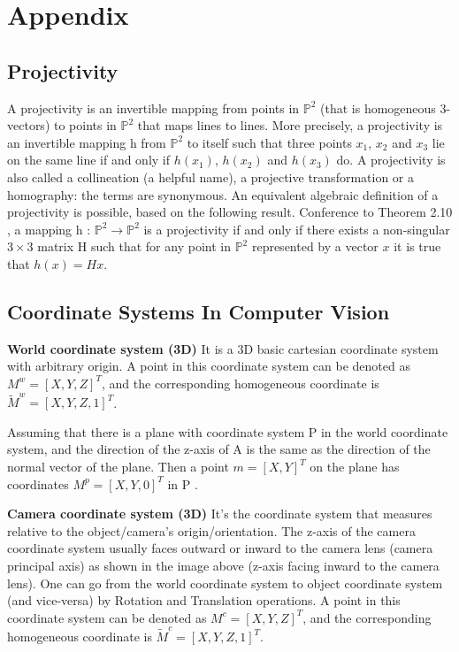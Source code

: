 \appendix
\section{Appendix}

\subsection{Projectivity}
\label{subsec:Projectivity}
A projectivity is an invertible mapping from points in $\mathbb{P}^2$ (that is homogeneous 3-vectors)
to points in $\mathbb{P}^2$ that maps lines to lines.
More precisely, a projectivity is an invertible mapping h from $\mathbb{P}^2$ to itself such that three points $x_1$, $x_2$ and $x_3$
lie on the same line if and only if $h(x_1)$, $h(x_2)$ and $h(x_3)$ do.
A projectivity is also called a collineation (a helpful name), a projective transformation or a homography: the terms are synonymous.
An equivalent algebraic definition of a projectivity is possible, based on the following result.
Conference to Theorem 2.10 \cite{hartley2003multiple}, a mapping h : $\mathbb{P}^2  \rightarrow \mathbb{P}^2$ is a projectivity if and only if there exists a
non-singular $3 \times 3$ matrix H such that for any point in $\mathbb{P}^2$ represented by a vector $x$ it
is true that $h(x) = Hx$.
\subsection{Coordinate Systems In Computer Vision}
\label{subsec:Coordinate Systems In Computer Vision}

\textbf{World coordinate system (3D)} It is a 3D basic cartesian coordinate system with arbitrary origin.
A point in this coordinate system can be denoted as $M^w=[X,Y,Z]^T$,
and the corresponding homogeneous coordinate is $\widetilde{M}^w=[X,Y,Z,1]^T$.

Assuming that there is a plane with coordinate system P in the world coordinate system,
and the direction of the z-axis of A is the same as the direction of the normal vector of the plane.
Then a point $m=[X,Y]^T$ on the plane has coordinates $M^p=[X,Y,0]^T$ in P .

\textbf{Camera coordinate system (3D)} It's the coordinate system that measures relative to the object/camera’s origin/orientation.
The z-axis of the camera coordinate system usually faces outward or inward to
the camera lens (camera principal axis) as shown in the image above (z-axis facing inward to the camera lens).
One can go from the world coordinate system to object coordinate system (and vice-versa) by Rotation and Translation operations.
A point in this coordinate system can be denoted as $M^c=[X,Y,Z]^T$,
and the corresponding homogeneous coordinate is $\widetilde{M}^c=[X,Y,Z,1]^T$.


